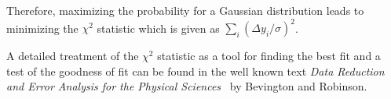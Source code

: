 Therefore, maximizing the probability for a Gaussian distribution leads to minimizing the $\chi^2$ statistic which is given as $\sum_i(\Delta y_i/\sigma)^2$.

A detailed treatment of the $\chi^2$ statistic as a tool for finding the best fit and a test of the goodness of fit can be found in the well known text\emph{ Data Reduction and Error Analysis for the Physical Sciences}~\cite{Bevington} by Bevington and Robinson.
